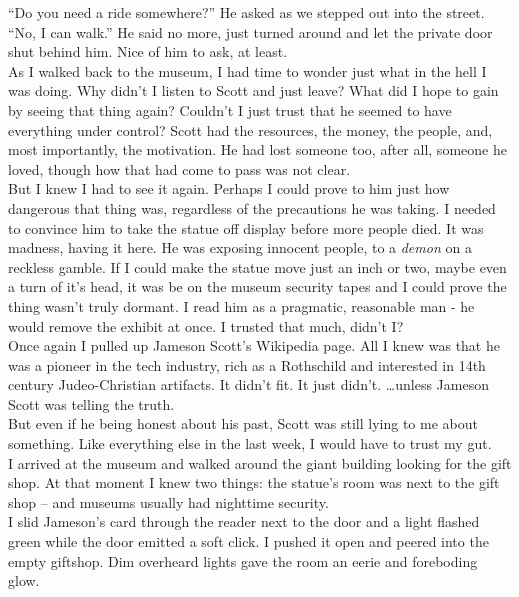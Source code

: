 \documentclass[a5paper]{scrartcl}
\begin{document}
\enquote{Do you need a ride somewhere?} He asked as we stepped out into the street.\\


\enquote{No, I can walk.} He said no more, just turned around and let the private door shut behind him.  Nice of him to ask, at least.\\


As I walked back to the museum, I had time to wonder just what in the hell I was doing. Why didn't I listen to Scott and just leave? What did I hope to gain by seeing that thing again? Couldn't I just trust that he seemed to have everything under control? Scott had the resources, the money, the people, and, most importantly, the motivation. He had lost someone too, after all, someone he loved, though how that had come to pass was not clear. \\


But I knew I had to see it again. Perhaps I could prove to him just how dangerous that thing was, regardless of the precautions he was taking. I needed to convince him to take the statue off display before more people died. It was madness, having it here. He was exposing innocent people, to a \textit{demon}
 on a reckless gamble. If I could make the statue move just an inch or two, maybe even a turn of it's head, it was be on the museum security tapes and I could prove the thing wasn't truly dormant. I read him as a pragmatic, reasonable man - he would remove the exhibit at once. I trusted that much, didn't I? \\


Once again I pulled up Jameson Scott's Wikipedia page. All I knew was that he was  a pioneer in the tech industry, rich as a Rothschild and interested in 14th century Judeo-Christian artifacts. It didn't fit. It just didn't. \dots unless Jameson Scott was telling the truth.\\


But even if he being honest about his past, Scott was still lying to me about something. Like everything else in the last week, I would have to trust my gut.\\


I arrived at the museum and walked around the giant building looking for the gift shop. At that moment I knew two things: the statue's room was next to the gift shop -- and museums usually had nighttime security.\\


I slid Jameson's card through the reader next to the door and a light flashed green while the door emitted a soft click. I pushed it open and peered into the empty giftshop. Dim overheard lights gave the room an eerie and foreboding glow. \\
\end{document}
